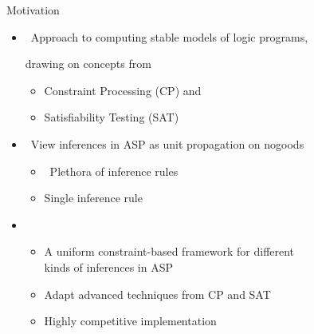 \begin{frame}{Motivation}
  \bigskip
  \begin{itemize}
  \item<1-> \ Approach to computing stable models of logic programs,

    drawing on concepts from
    \begin{itemize}\normalsize
    \item Constraint Processing (CP) and
    \item Satisfiability Testing (SAT)
    \end{itemize}
    \medskip
  \item<1-> \ View inferences in ASP as unit propagation on nogoods
    \begin{itemize}\normalsize
    \item <only@2-3>  \ Plethora of inference rules
    \item <only@2-3>  \quad  Single inference rule
    \end{itemize}
    \medskip
  \item<only@4-> 
    \begin{itemize}\normalsize
    \item A uniform constraint-based framework for different\\ kinds of inferences in ASP
    \item Adapt advanced techniques from CP and SAT
    \item Highly competitive implementation
    \end{itemize}
  \end{itemize}
\end{frame}
%
